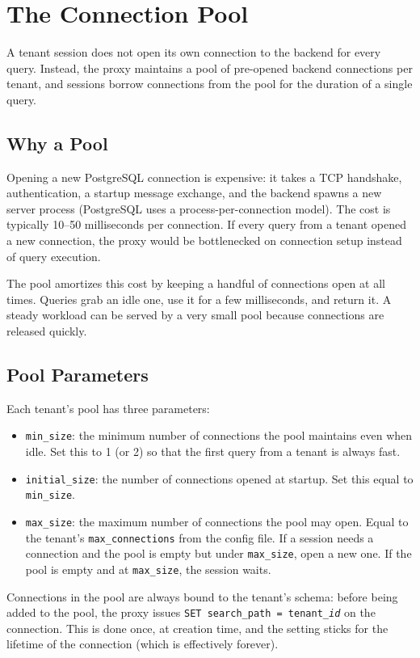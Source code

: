 \documentclass[11pt,a4paper]{article}
\begin{document}
\section{The Connection Pool}

A tenant session does not open its own connection to the backend for every query. Instead, the proxy maintains a pool of pre-opened backend connections per tenant, and sessions borrow connections from the pool for the duration of a single query.

\subsection{Why a Pool}
Opening a new PostgreSQL connection is expensive: it takes a TCP handshake, authentication, a startup message exchange, and the backend spawns a new server process (PostgreSQL uses a process-per-connection model). The cost is typically 10--50 milliseconds per connection. If every query from a tenant opened a new connection, the proxy would be bottlenecked on connection setup instead of query execution.

The pool amortizes this cost by keeping a handful of connections open at all times. Queries grab an idle one, use it for a few milliseconds, and return it. A steady workload can be served by a very small pool because connections are released quickly.

\subsection{Pool Parameters}
Each tenant's pool has three parameters:

\begin{itemize}
\item \texttt{min\_size}: the minimum number of connections the pool maintains even when idle. Set this to 1 (or 2) so that the first query from a tenant is always fast.
\item \texttt{initial\_size}: the number of connections opened at startup. Set this equal to \texttt{min\_size}.
\item \texttt{max\_size}: the maximum number of connections the pool may open. Equal to the tenant's \texttt{max\_connections} from the config file. If a session needs a connection and the pool is empty but under \texttt{max\_size}, open a new one. If the pool is empty and at \texttt{max\_size}, the session waits.
\end{itemize}

Connections in the pool are always bound to the tenant's schema: before being added to the pool, the proxy issues \texttt{SET search\_path = tenant\_\textit{id}} on the connection. This is done once, at creation time, and the setting sticks for the lifetime of the connection (which is effectively forever).
\end{document}
